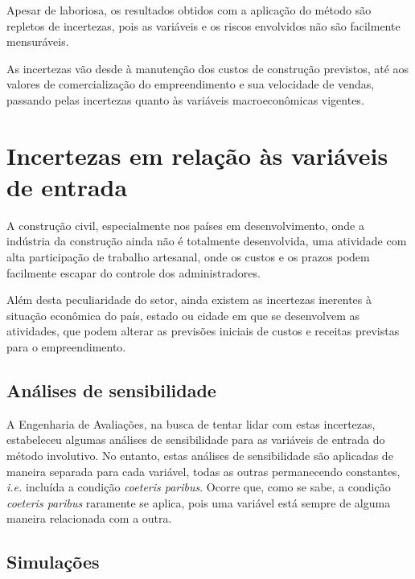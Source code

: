 \documentclass[
	12pt,				%
	oneside,			%
	a4paper,			%
	chapter=TITLE,		%
	section=TITLE,		%
	english,			%
	brazil				%
	]{abntex2}
\begin{document}
Apesar de laboriosa, os resultados obtidos com a aplicação do método são repletos
de incertezas, pois as variáveis e os riscos envolvidos não são facilmente
mensuráveis.

As incertezas vão desde à manutenção dos custos de construção previstos, até aos
valores de comercialização do empreendimento e sua velocidade de vendas,
passando pelas incertezas quanto às variáveis macroeconômicas vigentes.

\hypertarget{incertezas-em-relauxe7uxe3o-uxe0s-variuxe1veis-de-entrada}{%
\section{Incertezas em relação às variáveis de entrada}\label{incertezas-em-relauxe7uxe3o-uxe0s-variuxe1veis-de-entrada}}

A construção civil, especialmente nos países em desenvolvimento, onde a
indústria da construção ainda não é totalmente desenvolvida, uma atividade com
alta participação de trabalho artesanal, onde os custos e os prazos podem
facilmente escapar do controle dos administradores.

Além desta peculiaridade do setor, ainda existem as incertezas inerentes à
situação econômica do país, estado ou cidade em que se desenvolvem as atividades,
que podem alterar as previsões iniciais de custos e receitas previstas para o
empreendimento.

\hypertarget{anuxe1lises-de-sensibilidade}{%
\subsection{Análises de sensibilidade}\label{anuxe1lises-de-sensibilidade}}

A Engenharia de Avaliações, na busca de tentar lidar com estas incertezas,
estabeleceu algumas análises de sensibilidade para as variáveis de entrada do
método involutivo. No entanto, estas análises de sensibilidade são aplicadas
de maneira separada para cada variável, todas as outras permanecendo constantes,
\emph{i.e.} incluída a condição \emph{coeteris paribus}. Ocorre que, como se sabe, a
condição \emph{coeteris paribus} raramente se aplica, pois uma variável está
sempre de alguma maneira relacionada com a outra.

\hypertarget{simulauxe7uxf5es}{%
\subsection{Simulações}\label{simulauxe7uxf5es}}
\end{document}
